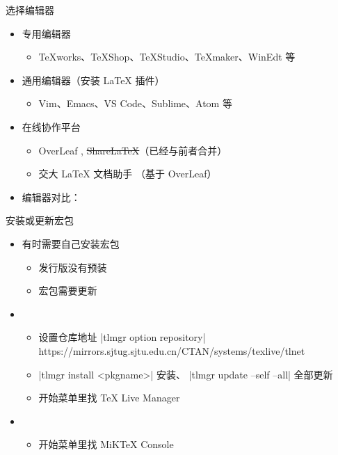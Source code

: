 \begin{frame}{选择编辑器}
  \begin{itemize}
    \item 专用编辑器
      \begin{itemize}
        \item TeXworks、TeXShop、\alert{TeXStudio}、TeXmaker、WinEdt 等
      \end{itemize}
    \item 通用编辑器（安装 \LaTeX{} 插件）
      \begin{itemize}
        \item Vim、Emacs、\alert{VS Code}、Sublime、Atom 等
      \end{itemize}
    \item 在线协作平台
      \begin{itemize}
        \item OverLeaf , \sout{ShareLaTeX}（已经与前者合并）
        \item 交大 LaTeX 文档助手 （基于 OverLeaf）
      \end{itemize}
    \item 编辑器对比：
  \end{itemize}
\end{frame}

\begin{frame}[fragile]{安装或更新宏包}
  \begin{itemize}
    \item 有时需要自己安装宏包
      \begin{itemize}
        \item 发行版没有预装
        \item 宏包需要更新
      \end{itemize}
    \item \TL
      \begin{itemize}
        \item 设置仓库地址 |tlmgr option repository| {\footnotesize\ttfamily
          https://mirrors.sjtug.sjtu.edu.cn/CTAN/systems/texlive/tlnet}
        \item |tlmgr install <pkgname>| 安装、 |tlmgr update --self --all| 全部更新
        \item \faWindows{} 开始菜单里找 TeX Live Manager 
      \end{itemize}
    \item \MiKTeX
      \begin{itemize}
        \item \faWindows{} 开始菜单里找 MiKTeX Console
      \end{itemize}
  \end{itemize}
\end{frame}
